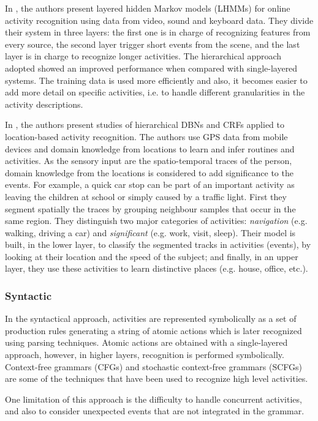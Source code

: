 In \citep{Oliver2002_LayRepHumActRec}, the authors present layered hidden Markov models (LHMMs) for online activity recognition using data from video, sound and keyboard data. 
They divide their system in three layers: the first one is in charge of recognizing features from every source, the second layer trigger short events from the scene, and the last layer is in charge to recognize longer activities. 
The hierarchical approach adopted showed an improved performance when compared with single-layered systems.
The training data is used more efficiently and also, it becomes easier to add more detail on specific activities, i.e. to handle different granularities in the activity descriptions.

In \citep{Liao2007_LIT,Liao2007_HCRFGPSAR}, the authors present studies of hierarchical DBNs and CRFs applied to location-based activity recognition.
The authors use GPS data from mobile devices and domain knowledge from locations to learn and infer routines and activities.
As the sensory input are the spatio-temporal traces of the person, domain knowledge from the locations is considered to add significance to the events. 
For example, a quick car stop can be part of an important activity as leaving the children at school or simply caused by a traffic light.
First they segment spatially the traces by grouping neighbour samples that occur in the same region.
They distinguish two major categories of activities: \textit{navigation} (e.g. walking, driving a car) and \textit{significant} (e.g. work, visit, sleep).
Their model is built, in the lower layer, to classify the segmented tracks in activities (events), by looking at their location and the speed of the subject; and finally, in an upper layer, they use these activities to learn distinctive places (e.g. house, office, etc.).


\subsubsection{Syntactic}
In the syntactical approach, activities are represented symbolically as a set of production rules generating a string of atomic actions which is later recognized using parsing techniques.
Atomic actions are obtained with a single-layered approach, however, in higher layers, recognition is performed symbolically.
Context-free grammars (CFGs) and stochastic context-free grammars (SCFGs) are some of the techniques that have been used to recognize high level activities.

One limitation of this approach is the difficulty to handle concurrent activities, and also to consider unexpected events that are not integrated in the grammar.

